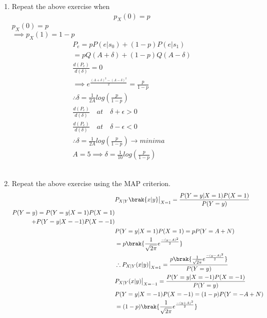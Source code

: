 \documentclass[journal,12pt,twocolumn]{IEEEtran}
\begin{document}
\begin{enumerate}[label=\thesection.\arabic*
,ref=\thesection.\theenumi]
\begin{align}
&\therefore A-\delta=A+\delta, \implies \delta=0\\
&f"(\delta)=k((A-\delta)e^{\frac{-(A-\delta)^{2}}{2}}+(A+\delta)e^{\frac{-(A+\delta)^{2}}{2}})>0
\end{align}
\item Repeat the above exercise when 
	\begin{align}
		p_{X}(0) = p
	\end{align}
\solution
 $p_{X}(0)=p$ \\
 $\implies p_{X}(1)=1-p$
 \begin{align}
 P_{e}=p P(e|s_0)+(1-p)P(e|s_1)\\
 =p Q(A+\delta)+(1-p)Q(A-\delta)\\
 \frac{d(P_{e})}{d(\delta)}=0\\
 \implies e^\frac{(A+\delta)^{2}-(A-\delta)^{2}}{2}=\frac{p}{1-p}\\
 \therefore \delta=\frac{1}{2A}log(\frac{p}{1-p})\\
  \frac{d(P_{e})}{d(\delta)}\quad at \quad \delta+\epsilon>0 \\
  \nonumber
   \frac{d(P_{e})}{d(\delta)} \quad at\quad \delta-\epsilon<0 \\
   \nonumber
   \therefore \delta=\frac{1}{2A}log\left(\frac{p}{1-p}\right)\longrightarrow   minima\\
   A=5 \implies \delta=\frac{1}{10}log\left(\frac{p}{1-p}\right)
 \end{align}
 \\
\item Repeat the above exercise using the MAP criterion. \\
\solution
\begin{align}
&P_{X|Y}\brak{x|y} \big|_{X=1}= \frac{P(Y=y|X=1)P(X=1)}{P(Y=y)}\\
\begin{split}P(Y=y)=P(Y=y|X=1)P(X=1)\\+P(Y=y|X=-1)P(X=-1)\end{split}\\
&P(Y=y|X=1)P(X=1)=p P(Y=A+N)\\
&=p\brak{\frac{1}{\sqrt{2 \pi}} e^{\frac{-(y-A)^2}{2}}}\\
&\therefore P_{X|Y}(x|y) \big|_{X=1}=\frac{p\brak{\frac{1}{\sqrt{2 \pi}} e^{\frac{-(y-A)^2}{2}}}}{P(Y=y)}\\
&P_{X|Y}(x|y) \big|_{X=-1}= \frac{P(Y=y|X=-1)P(X=-1)}{P(Y=y)}\\
&P(Y=y|X=-1)P(X=-1)=(1-p) P(Y=-A+N)\nonumber\\
&=(1-p)\brak{\frac{1}{\sqrt{2 \pi}} e^{\frac{-(y+A)^2}{2}}}\\

\end{align}
\end{enumerate}
\end{document}
